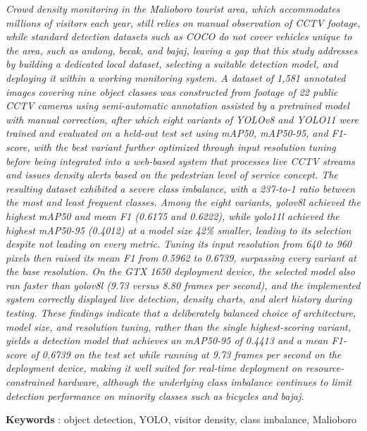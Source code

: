 \textit{
 Crowd density monitoring in the Malioboro tourist area, which accommodates 
 millions of visitors each year, still relies on manual observation of CCTV 
 footage, while standard detection datasets such as COCO do not cover 
 vehicles unique to the area, such as \textit{andong}, \textit{becak}, and 
 \textit{bajaj}, leaving a gap that this study addresses by building a 
 dedicated local dataset, selecting a suitable detection model, and 
 deploying it within a working monitoring system. A dataset of 1,581 
 annotated images covering nine object classes was constructed from footage 
 of 22 public CCTV cameras using semi-automatic annotation assisted by a 
 pretrained model with manual correction, after which eight variants of 
 YOLOv8 and YOLO11 were trained and evaluated on a held-out test set using 
 mAP50, mAP50-95, and F1-score, with the best variant further optimized 
 through input resolution tuning before being integrated into a web-based 
 system that processes live CCTV streams and issues density alerts based 
 on the pedestrian level of service concept. The resulting dataset 
 exhibited a severe class imbalance, with a 237-to-1 ratio between the 
 most and least frequent classes. Among the eight variants, yolov8l 
 achieved the highest mAP50 and mean F1 (0.6175 and 0.6222), while yolo11l 
 achieved the highest mAP50-95 (0.4012) at a model size 42\% smaller, 
 leading to its selection despite not leading on every metric. Tuning its 
 input resolution from 640 to 960 pixels then raised its mean F1 from 
 0.5962 to 0.6739, surpassing every variant at the base resolution. On the 
 GTX 1650 deployment device, the selected model also ran faster than 
 yolov8l (9.73 versus 8.80 frames per second), and the implemented system 
 correctly displayed live detection, density charts, and alert history 
 during testing. These findings indicate that a deliberately balanced 
 choice of architecture, model size, and resolution tuning, rather than 
 the single highest-scoring variant, yields a detection model that achieves an 
 mAP50-95 of 0.4413 and a mean F1-score of 0.6739 on the test set while running at 9.73 
 frames per second on the deployment device, making it well 
 suited for real-time deployment on resource-constrained hardware, although 
 the underlying class imbalance continues to limit detection performance 
 on minority classes such as bicycles and \textit{bajaj}.
}

\noindent\textbf{Keywords} : object detection, YOLO, visitor density, class imbalance, Malioboro